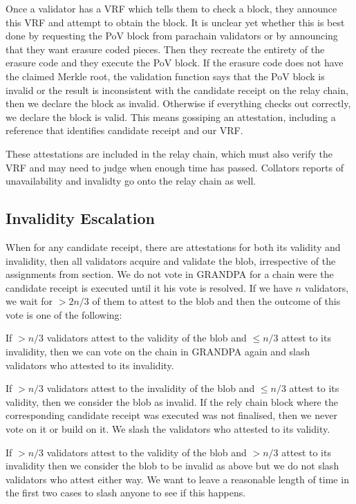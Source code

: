 Once a validator has a VRF which tells them to check a block, they announce this VRF and attempt to obtain the block. 
It is unclear yet whether this is best done by requesting the PoV block from parachain validators or by announcing that they want erasure coded pieces. 
Then they recreate the entirety of the erasure code and they execute the PoV block. 
If the erasure code does not have the claimed Merkle root, the validation function says that the PoV block is invalid or the result is inconsistent with the candidate receipt on the relay chain, then we declare the block as invalid. 
Otherwise if everything checks out correctly, we declare the block is valid. This means gossiping an attestation, including a reference that identifies candidate receipt and our VRF. 

These attestations are included in the relay chain, which must also verify the VRF and may need to judge when enough time has passed. Collators reports of unavailability and invalidty go onto the relay chain as well.

\subsection{Invalidity Escalation}\label{escalation}

When for any candidate receipt, there are attestations for both its validity and invalidity, then all validators acquire and validate the blob, irrespective of the assignments from section. We do not vote in GRANDPA for a chain were the candidate receipt is executed until it his vote is resolved. If we have $n$ validators, we wait for $>2n/3$ of them to attest to the blob and then the outcome of this vote is one of the following:

If $>n/3$ validators attest to the validity of the blob and $\leq n/3$ attest to its invalidity, then we can vote on the chain in GRANDPA again and slash validators who attested to its invalidity.

If $>n/3$ validators attest to the invalidity of the blob and $\leq n/3$ attest to its validity, then we consider the blob as invalid. If the rely chain block where the corresponding candidate receipt was executed was not finalised, then we never vote on it or build on it. We slash the validators who attested to its validity.

If $>n/3$ validators attest to the validity of the blob and $>n/3$ attest to its invalidity then we consider the blob to be invalid as above but we do not slash validators who attest either way. We want to leave a reasonable length of time in the first two cases to slash anyone to see if this happens.

